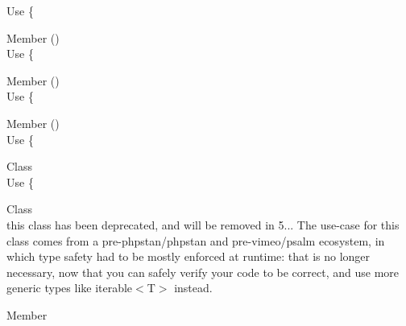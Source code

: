 \begin{DoxyRefList}
\label{deprecated__deprecated000296}%
%
Use \{ 
\item[Member \doxylink{class_ramsey_1_1_uuid_1_1_lazy_1_1_lazy_uuid_from_string_ab967b472a10ce1ee0681917de067664c}{Ramsey\textbackslash{}Uuid\textbackslash{}Lazy\textbackslash{}Lazy\+Uuid\+From\+String\+::get\+Time\+Low} ()]\hfill \\
\label{deprecated__deprecated000297}%
%
Use \{ 
\item[Member \doxylink{class_ramsey_1_1_uuid_1_1_lazy_1_1_lazy_uuid_from_string_af31a06405647b7e227e5789268e7ad57}{Ramsey\textbackslash{}Uuid\textbackslash{}Lazy\textbackslash{}Lazy\+Uuid\+From\+String\+::get\+Time\+Mid} ()]\hfill \\
\label{deprecated__deprecated000298}%
%
Use \{ 
\item[Member \doxylink{class_ramsey_1_1_uuid_1_1_lazy_1_1_lazy_uuid_from_string_addb658c48592b59b8e9008144cee6797}{Ramsey\textbackslash{}Uuid\textbackslash{}Lazy\textbackslash{}Lazy\+Uuid\+From\+String\+::get\+Timestamp} ()]\hfill \\
\label{deprecated__deprecated000299}%
%
Use \{ 
\item[Class \doxylink{class_ramsey_1_1_uuid_1_1_nonstandard_1_1_uuid_v6}{Ramsey\textbackslash{}Uuid\textbackslash{}Nonstandard\textbackslash{}Uuid\+V6} ]\hfill \\
\label{deprecated__deprecated000300}%
%
Use \{ 
\item[Class \doxylink{class_ramsey_1_1_uuid_1_1_provider_1_1_node_1_1_node_provider_collection}{Ramsey\textbackslash{}Uuid\textbackslash{}Provider\textbackslash{}Node\textbackslash{}Node\+Provider\+Collection} ]\hfill \\
\label{deprecated__deprecated000301}%
%
this class has been deprecated, and will be removed in 5... The use-\/case for this class comes from a pre-\/{\ttfamily phpstan/phpstan} and pre-\/{\ttfamily vimeo/psalm} ecosystem, in which type safety had to be mostly enforced at runtime\+: that is no longer necessary, now that you can safely verify your code to be correct, and use more generic types like {\ttfamily iterable\texorpdfstring{$<$}{<}T\texorpdfstring{$>$}{>}} instead. 
\item[Member \doxylink{class_ramsey_1_1_uuid_1_1_uuid_a7e9cd36e784516e05c0313bdf9ee71ce}{Ramsey\textbackslash{}Uuid\textbackslash{}Uuid\+::UUID\+\_\+\+TYPE\+\_\+\+IDENTIFIER} ]\hfill \\

\end{DoxyRefList}
